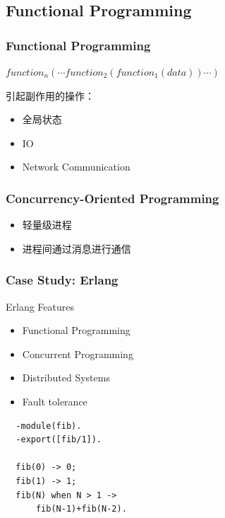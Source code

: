 \subsection{Functional Programming}
\begin{frame}[t]
  \frametitle{Functional Programming}
  \begin{definition}
    $function_n(\cdots function_2(function_1(data))\cdots)$
  \end{definition}

  引起副作用的操作：
  \begin{itemize}
    \item 全局状态
    \item IO
    \item Network Communication 
  \end{itemize}
\end{frame}

\begin{frame}
  \frametitle{Concurrency-Oriented Programming}
  \begin{itemize}
    \item 轻量级进程
    \item 进程间通过消息进行通信
  \end{itemize}
\end{frame}

\begin{frame}[containsverbatim]
  \frametitle{Case Study: Erlang}
  \begin{block}{Erlang Features}
    \begin{itemize}
      \item Functional Programming
      \item Concurrent Programming
      \item Distributed Systems
      \item Fault tolerance
    \end{itemize}
  \end{block}

  \begin{verbatim}
  -module(fib).
  -export([fib/1]).

  fib(0) -> 0;
  fib(1) -> 1;
  fib(N) when N > 1 ->
      fib(N-1)+fib(N-2).
  \end{verbatim}
\end{frame}

